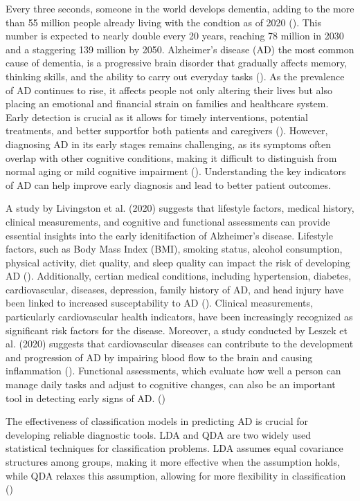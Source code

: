 \documentclass[12pt]{article}
\begin{document}
Every three seconds, someone in the world develops dementia, adding to the more than 55 million people already 
living with the condtion as of 2020 (\cite{alzint_dementia_statistics}). This number is expected to nearly double 
every 20 years, reaching 78 million in 2030 and a staggering 139 million by 2050. Alzheimer's disease (AD) the most
common cause of dementia, is a progressive brain disorder that gradually affects memory, thinking skills, and the ability
to carry out everyday tasks (\cite{AlzheimersAssociation2021}). As the prevalence of AD continues to rise, it affects people not only altering their lives 
but also placing an emotional and financial strain on families and healthcare system. Early detection is crucial as it allows for 
timely interventions, potential treatments, and better supportfor both patients and caregivers (\cite{Dubois2016}). However, diagnosing AD in its early stages remains challenging, 
as its symptoms often overlap with other cognitive conditions, making it difficult to distinguish from normal aging or mild cognitive impairment (\cite{Jack2018}). Understanding the key
indicators of AD can help improve early diagnosis and lead to better patient outcomes.

A study by Livingston et al. (2020) suggests that lifestyle factors, medical history, clinical measurements, and cognitive and functional assessments can provide essential insights into the
early idenitifaction of Alzheimer's disease. Lifestyle factors, such as Body Mass Index (BMI), smoking status, alcohol consumption, physical activity, diet quality, and sleep quality can impact 
the risk of developing AD (\cite{nih_healthy_lifestyle}). Additionally, certian medical conditions, including hypertension, diabetes, cardiovascular, diseases, depression, family history of AD, and
head injury have been linked to increased susceptability to AD (\cite{Kivipelto2018}). Clinical measurements, particularly cardiovascular health indicators, have been increasingly recognized as significant
risk factors for the disease. Moreover, a study conducted by Leszek et al. (2020) suggests that cardiovascular diseases can contribute to the development and progression of AD by impairing blood flow to the brain
and causing inflammation (\cite{Leszek2021}). Functional assessments, which evaluate how well a person can manage daily tasks and adjust to cognitive changes, can also be an important tool in detecting early signs of AD. (\cite{sperling2011})

The effectiveness of classification models in predicting AD is crucial for developing reliable diagnostic tools. LDA and QDA are two widely used statistical techniques for classification problems. LDA assumes equal covariance structures
among groups, making it more effective when the assumption holds, while QDA relaxes this assumption, allowing for more flexibility in classification (\cite{elements_statistical_learning})
\end{document}
